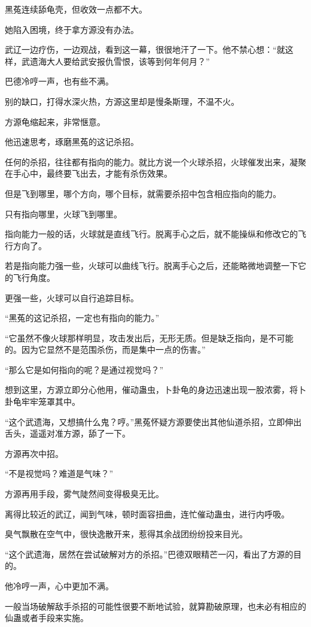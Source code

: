 \begin{this_body}
黑菟连续舔龟壳，但收效一点都不大。

她陷入困境，终于拿方源没有办法。

武辽一边疗伤，一边观战，看到这一幕，很很地汗了一下。他不禁心想：“就这样，武遗海大人要给武安报仇雪恨，该等到何年何月？”

巴德冷哼一声，也有些不满。

别的缺口，打得水深火热，方源这里却是慢条斯理，不温不火。

方源龟缩起来，非常惬意。

他迅速思考，琢磨黑菟的这记杀招。

任何的杀招，往往都有指向的能力。就比方说一个火球杀招，火球催发出来，凝聚在手心中，最终要飞出去，才能有杀伤效果。

但是飞到哪里，哪个方向，哪个目标，就需要杀招中包含相应指向的能力。

只有指向哪里，火球飞到哪里。

指向能力一般的话，火球就是直线飞行。脱离手心之后，就不能操纵和修改它的飞行方向了。

若是指向能力强一些，火球可以曲线飞行。脱离手心之后，还能略微地调整一下它的飞行角度。

更强一些，火球可以自行追踪目标。

“黑菟的这记杀招，一定也有指向的能力。”

“它虽然不像火球那样明显，攻击发出后，无形无质。但是缺乏指向，是不可能的。因为它显然不是范围杀伤，而是集中一点的伤害。”

“那么它是如何指向的呢？是通过视觉吗？”

想到这里，方源立即分心他用，催动蛊虫，卜卦龟的身边迅速出现一股浓雾，将卜卦龟牢牢笼罩其中。

“这个武遗海，又想搞什么鬼？哼。”黑菟怀疑方源要使出其他仙道杀招，立即伸出舌头，遥遥对准方源，舔了一下。

方源再次中招。

“不是视觉吗？难道是气味？”

方源再用手段，雾气陡然间变得极臭无比。

离得比较近的武辽，闻到气味，顿时面容扭曲，连忙催动蛊虫，进行内呼吸。

臭气飘散在空气中，很快逸散开来，惹得其余战团纷纷投来目光。

“这个武遗海，居然在尝试破解对方的杀招。”巴德双眼精芒一闪，看出了方源的目的。

他冷哼一声，心中更加不满。

一般当场破解敌手杀招的可能性很要不断地试验，就算勘破原理，也未必有相应的仙蛊或者手段来实施。


\end{this_body}
